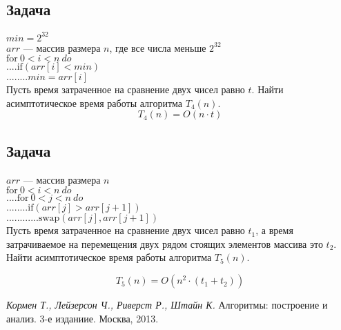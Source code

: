 \documentclass[12pt, twoside]{article}
\begin{document}
\subsection{Задача}
$min = 2^{32}$\\
$arr$ --- массив размера $n$, где все числа меньше $2^{32}$\\
$\text{for}~0<i<n~do$\\
$....\text{if}(arr[i] < min)$\\
$........min = arr[i]$\\

Пусть время затраченное на сравнение двух чисел равно $t$. Найти асимптотическое время работы алгоритма  $T_4(n)$.
$$T_4(n) = O(n\cdot t)$$


\subsection{Задача}
$arr$  --- массив размера $n$\\
$\text{for}~0<i<n~do$\\
$....\text{for}~0<j<n~do$\\
$........\text{if}(arr[j] > arr[j+1])$\\
$............\text{swap}(arr[j], arr[j+1])$\\

Пусть время затраченное на сравнение двух чисел равно $t_1$, а время затрачиваемое на перемещения двух рядом стоящих элементов массива это $t_2$. Найти асимптотическое время работы алгоритма  $T_5(n)$.

$$T_5(n) = O(n^2\cdot (t_1+t_2))$$

\begin{thebibliography}{99}
	\textit{Кормен Т., Лейзерсон Ч., Риверст Р., Штайн К.} Алгоритмы: построение и анализ. 3-е изданиие. Москва, 2013.
\end{thebibliography}
\end{document}
